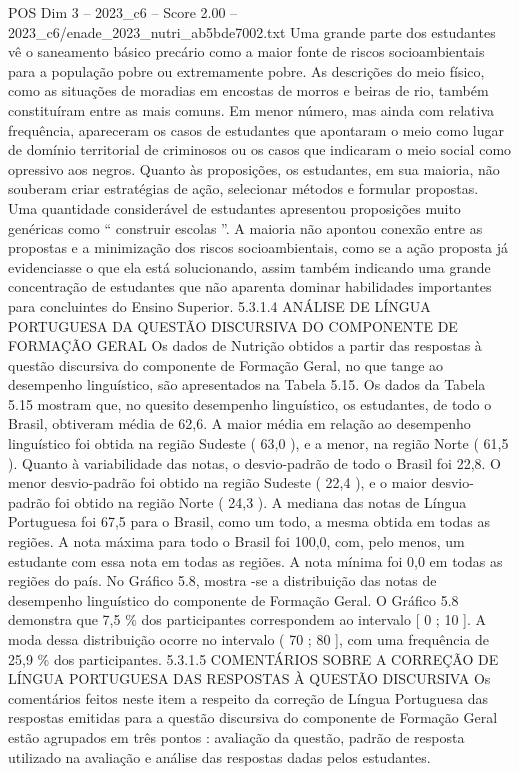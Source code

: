 \begin{textsample}{POS Dim 3 – 2023\_c6 – Score 2.00 – 2023\_c6/enade\_2023\_nutri\_ab5bde7002.txt}
Uma grande parte dos estudantes vê o saneamento básico precário como a maior fonte de riscos socioambientais para a população pobre ou extremamente pobre.
As descrições do meio físico, como as situações de moradias em encostas de morros e beiras de rio, também constituíram entre as mais comuns.
Em menor número, mas ainda com relativa frequência, apareceram os casos de estudantes que apontaram o meio como lugar de domínio territorial de criminosos ou os casos que indicaram o meio social como opressivo aos negros.
Quanto às proposições, os estudantes, em sua maioria, não souberam criar estratégias de ação, selecionar métodos e formular propostas.
Uma quantidade considerável de estudantes apresentou proposições muito genéricas como “ construir escolas ”.
A maioria não apontou conexão entre as propostas e a minimização dos riscos socioambientais, como se a ação proposta já evidenciasse o que ela está solucionando, assim também indicando uma grande concentração de estudantes que não aparenta dominar habilidades importantes para concluintes do Ensino Superior. 5.3.1.4 ANÁLISE DE LÍNGUA PORTUGUESA DA QUESTÃO DISCURSIVA DO COMPONENTE DE FORMAÇÃO GERAL Os dados de Nutrição obtidos a partir das respostas à questão discursiva do componente de Formação Geral, no que tange ao desempenho linguístico, são apresentados na Tabela 5.15.
Os dados da Tabela 5.15 mostram que, no quesito desempenho linguístico, os estudantes, de todo o Brasil, obtiveram média de 62,6.
A maior média em relação ao desempenho linguístico foi obtida na região Sudeste ( 63,0 ), e a menor, na região Norte ( 61,5 ).
Quanto à variabilidade das notas, o desvio-padrão de todo o Brasil foi 22,8.
O menor desvio-padrão foi obtido na região Sudeste ( 22,4 ), e o maior desvio-padrão foi obtido na região Norte ( 24,3 ).
A mediana das notas de Língua Portuguesa foi 67,5 para o Brasil, como um todo, a mesma obtida em todas as regiões.
A nota máxima para todo o Brasil foi 100,0, com, pelo menos, um estudante com essa nota em todas as regiões.
A nota mínima foi 0,0 em todas as regiões do país.
No Gráfico 5.8, mostra -se a distribuição das notas de desempenho linguístico do componente de Formação Geral.
O Gráfico 5.8 demonstra que 7,5 \% dos participantes correspondem ao intervalo [ 0 ; 10 ].
A moda dessa distribuição ocorre no intervalo ( 70 ; 80 ], com uma frequência de 25,9 \% dos participantes. 5.3.1.5 COMENTÁRIOS SOBRE A CORREÇÃO DE LÍNGUA PORTUGUESA DAS RESPOSTAS À QUESTÃO DISCURSIVA Os comentários feitos neste item a respeito da correção de Língua Portuguesa das respostas emitidas para a questão discursiva do componente de Formação Geral estão agrupados em três pontos : avaliação da questão, padrão de resposta utilizado na avaliação e análise das respostas dadas pelos estudantes.

\end{textsample}
